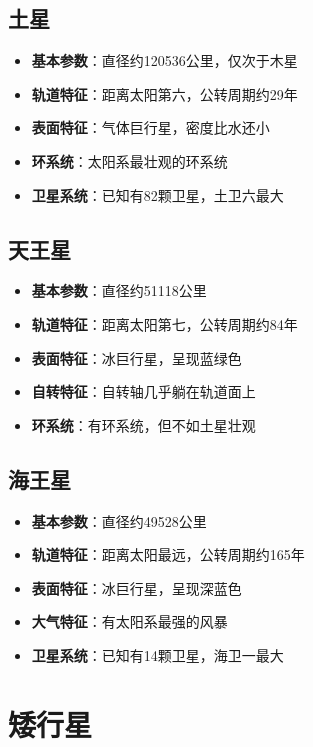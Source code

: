 \documentclass[12pt,UTF8]{ctexbook}
\begin{document}
\subsection{土星}

\begin{itemize}
  \item \textbf{基本参数}：直径约120536公里，仅次于木星
  \item \textbf{轨道特征}：距离太阳第六，公转周期约29年
  \item \textbf{表面特征}：气体巨行星，密度比水还小
  \item \textbf{环系统}：太阳系最壮观的环系统
  \item \textbf{卫星系统}：已知有82颗卫星，土卫六最大
\end{itemize}

\subsection{天王星}

\begin{itemize}
  \item \textbf{基本参数}：直径约51118公里
  \item \textbf{轨道特征}：距离太阳第七，公转周期约84年
  \item \textbf{表面特征}：冰巨行星，呈现蓝绿色
  \item \textbf{自转特征}：自转轴几乎躺在轨道面上
  \item \textbf{环系统}：有环系统，但不如土星壮观
\end{itemize}

\subsection{海王星}

\begin{itemize}
  \item \textbf{基本参数}：直径约49528公里
  \item \textbf{轨道特征}：距离太阳最远，公转周期约165年
  \item \textbf{表面特征}：冰巨行星，呈现深蓝色
  \item \textbf{大气特征}：有太阳系最强的风暴
  \item \textbf{卫星系统}：已知有14颗卫星，海卫一最大
\end{itemize}

\section{矮行星}
\end{document}
